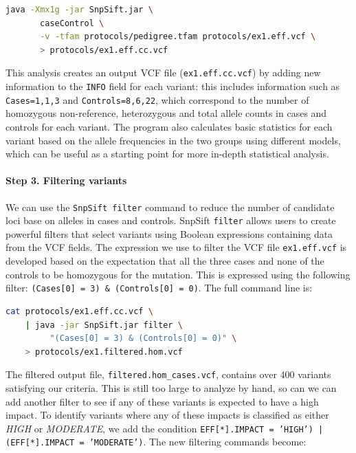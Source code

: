 \begin{lstlisting}[language=bash]
java -Xmx1g -jar SnpSift.jar \
       caseControl \
       -v -tfam protocols/pedigree.tfam protocols/ex1.eff.vcf \
       > protocols/ex1.eff.cc.vcf
\end{lstlisting}

This analysis creates an output VCF file (\texttt{ex1.eff.cc.vcf}) by adding new information to the \texttt{INFO} field for each variant: this includes information such as \texttt{Cases=1,1,3} and \texttt{Controls=8,6,22}, which correspond to the number of homozygous non-reference, heterozygous and total allele counts in cases and controls for each variant. The program also calculates basic statistics for each variant based on the allele frequencies in the two groups using different models, which can be useful as a starting point for more in-depth statistical analysis.

\paragraph{Step 3. Filtering variants} We can use the \texttt{SnpSift filter} command to reduce the number of candidate loci base on alleles in cases and controls. SnpSift \texttt{filter} allows users to create powerful filters that select variants using Boolean expressions containing data from the VCF fields. The expression we use to filter the VCF file \texttt{ex1.eff.vcf} is developed based on the expectation that all the three cases and none of the controls to be homozygous for the mutation. This is expressed using the following filter: \texttt{(Cases[0] = 3) \& (Controls[0] = 0)}. The full command line is:

\begin{lstlisting}[language=bash]
cat protocols/ex1.eff.cc.vcf \
    | java -jar SnpSift.jar filter \
         "(Cases[0] = 3) & (Controls[0] = 0)" \
    > protocols/ex1.filtered.hom.vcf
\end{lstlisting}

The filtered output file, \texttt{filtered.hom\_cases.vcf}, contains over 400 variants satisfying our criteria. This is still too large to analyze by hand, so can we can add another filter to see if any of these variants is expected to have a high impact. To identify variants where any of these impacts is classified as either \textit{HIGH} or \textit{MODERATE}, we add the condition \texttt{EFF[*].IMPACT = 'HIGH') | (EFF[*].IMPACT = 'MODERATE')}. The new filtering commands become:

